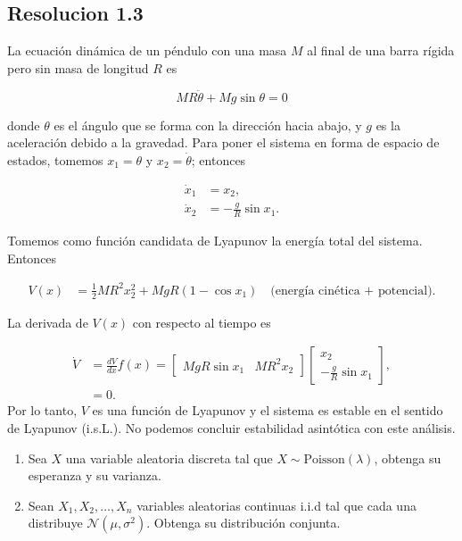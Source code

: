 \documentclass[
  11pt,
  letterpaper,
   addpoints,
   answers
  ]{exam}
\begin{document}
\begin{questions}
\begin{solution}
\subsection*{Resolucion 1.3}
La ecuación dinámica de un péndulo con una masa \( M \) al final de una barra rígida pero sin masa de longitud \( R \) es

\[
    MR\ddot{\theta} + Mg \sin \theta = 0
\]

donde \( \theta \) es el ángulo que se forma con la dirección hacia abajo, y \( g \) es la aceleración debido a la gravedad. Para poner el sistema en forma de espacio de estados, tomemos \( x_1 = \theta \) y \( x_2 = \dot{\theta} \); entonces

\begin{align}
    \dot{x}_1 &= x_2, \\
    \dot{x}_2 &= -\frac{g}{R} \sin x_1.
\end{align}

Tomemos como función candidata de Lyapunov la energía total del sistema. Entonces

\begin{align}
    V(x) &= \frac{1}{2} MR^2 x_2^2 + MgR (1 - \cos x_1) \quad \text{(energía cinética + potencial)}.
\end{align}

La derivada de \( V(x) \) con respecto al tiempo es

\begin{align}
    \dot{V} &= \frac{dV}{dx} f(x) = \begin{bmatrix} MgR \sin x_1 & MR^2 x_2 \end{bmatrix} \begin{bmatrix} x_2 \\ -\frac{g}{R} \sin x_1 \end{bmatrix}, \\
    &= 0.
\end{align}
Por lo tanto, \( V \) es una función de Lyapunov y el sistema es estable en el sentido de Lyapunov (i.s.L.). No podemos concluir estabilidad asintótica con este análisis.


\end{solution}
\question 
    \begin{enumerate}
    \item Sea \( X \) una variable aleatoria discreta tal que \( X \sim \text{Poisson}(\lambda) \), obtenga su esperanza y su varianza.
    
    \item Sean \( X_1, X_2, \dots, X_n \) variables aleatorias continuas i.i.d tal que cada una distribuye \( \mathcal{N}(\mu, \sigma^2) \). Obtenga su distribución conjunta.
    

\end{enumerate}
\end{questions}
\end{document}
